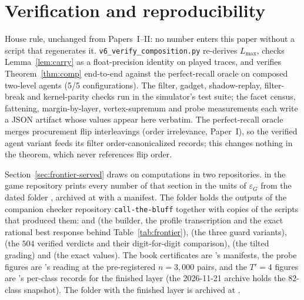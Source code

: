 \documentclass[11pt]{article}
\theoremstyle{plain}
\theoremstyle{definition}
\theoremstyle{remark}
\newcommand{\code}[1]{\texttt{\small #1}}
\newcommand{\game}{\ensuremath{G}}
\newcommand{\epsG}{\ensuremath{\varepsilon_{\game}}}
\begin{document}
\appendix

\section{Verification and reproducibility}\label{sec:verification}

House rule, unchanged from Papers~I--II: no number enters this paper
without a script that regenerates it. \code{v6\_verify\_composition.py}
re-derives $L_{\max}$, checks Lemma~\ref{lem:carry} as a
float-precision identity on played traces, and verifies
Theorem~\ref{thm:comp} end-to-end against the perfect-recall oracle on
composed two-level agents (5/5 configurations). The filter, gadget,
shadow-replay, filter-break and kernel-parity checks run in the
simulator's test suite; the facet census, fattening, margin-by-layer,
vertex-supremum and probe measurements each write a JSON artifact
whose values appear here verbatim. The perfect-recall oracle merges
procurement flip interleavings (order irrelevance, Paper~I), so the
verified agent variant feeds its filter order-canonicalized records;
this changes nothing in the theorem, which never references flip
order.

Section~\ref{sec:frontier-served} draws on computations in two
repositories.  in
the game repository prints every number of that section in the units of
$\epsG$ from the dated folder ,
archived at 
with a manifest. The folder holds the outputs of the companion checker
repository \code{call-the-bluff} together with copies of the scripts
that produced them:  and
 (the builder, the profile transcription and
the exact rational best response behind Table~\ref{tab:frontier}),
 (the three guard
variants), 
(the $504$ verified verdicts and their digit-for-digit comparison),
 (the tilted
grading) and  (the exact values). The book
certificates are 's manifests, the probe figures
are 's reading at the pre-registered
$n=3{,}000$ pairs, and the $T'=4$ figures are 's
per-class records for the finished layer (the 2026-11-21 archive holds
the $82$-class snapshot). The folder with the finished layer is
archived at .
\end{document}
